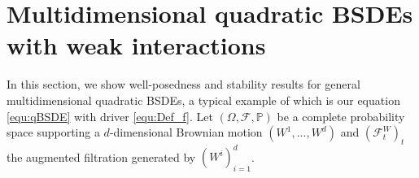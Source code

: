 \documentclass[10pt,a4paper]{article}
\newcommand{\MF}{{\mathcal{F}}}
\theoremstyle{plain}
\theoremstyle{definition}
\numberwithin{equation}{section}
\begin{document}

\section{Multidimensional quadratic BSDEs with weak interactions}
\label{sec3}

In this section, we show well-posedness and stability results for general multidimensional quadratic BSDEs, a typical example of which is our equation \eqref{equ:qBSDE} with driver \eqref{equ:Def_f}. Let $(\Omega,\mathcal{F}, \mathbb{P})$ be a complete probability space supporting a $d$-dimensional Brownian motion $(W^{1},...,W^{d})$ and $(\MF^W_t)_t$ the augmented filtration generated by $(W^i)_{i=1}^d$.



\end{document}
